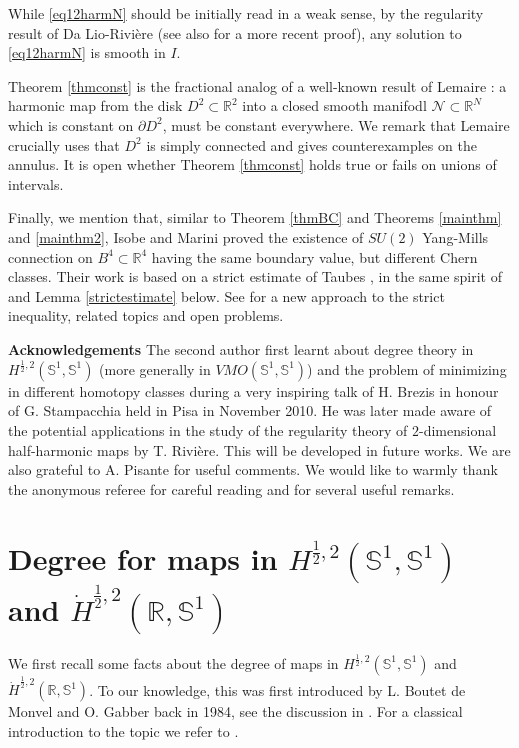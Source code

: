 \documentclass[12pt, a4paper]{article}
\newcommand{\sph}{\mathbb{S}}
\newcommand{\R}{\mathbb{R}}
\renewcommand{\(}{\left(}
\renewcommand{\)}{\right)}
\begin{document}
While \eqref{eq12harmN} should be initially read in a weak sense, by the regularity result of Da Lio-Rivi\`ere \cite{DLR2} (see also \cite{MazSch0} for a more recent proof), any solution to \eqref{eq12harmN} is smooth in $I$.

Theorem \ref{thmconst} is the fractional analog of a well-known result of Lemaire \cite{Lem}: a harmonic map from the disk $D^2\subset\R^2$ into a closed smooth manifodl $\mathcal{N}\subset\R^N$ which is constant on $\partial D^2$, must be constant everywhere. We remark that Lemaire crucially uses that $D^2$ is simply connected and gives counterexamples on the annulus. It is open whether Theorem \ref{thmconst} holds true or fails on unions of intervals.

\medskip

Finally, we mention that, similar to Theorem \ref{thmBC} and Theorems \ref{mainthm} and \ref{mainthm2}, Isobe and Marini \cite{IsoMar} proved the existence of $SU(2)$ Yang-Mills connection on $B^4\subset\R^4$ having the same boundary value, but different Chern classes. Their work is based on a strict estimate of Taubes \cite{Tau}, in the same spirit of \cite[Lemma 2]{bc} and Lemma \ref{strictestimate} below. See \cite{MarRiv} for a new approach to the strict inequality, related topics and open problems.

\medskip


\noindent\textbf{Acknowledgements} The second author first learnt about degree theory in $H^{\frac12,2}(\sph^1,\sph^1)$ (more generally in $VMO(\sph^1,\sph^1)$) and the problem of minimizing in different homotopy classes during a very inspiring talk of H. Brezis in honour of G. Stampacchia held in Pisa in November 2010. He was later made aware of the potential applications in the study of the regularity theory of $2$-dimensional half-harmonic maps by T. Rivi\`ere. This will be developed in future works. We are also grateful to A. Pisante for useful comments. We would like to warmly thank the anonymous referee for careful reading and for several useful remarks.



\section{Degree for maps in $H^{\frac{1}{2},2}(\sph^1,\sph^1)$ and $\dot H^{\frac{1}{2},2}(\R,\sph^1)$}\label{a:deg}

We first recall some facts about the degree of maps in $H^{\frac{1}{2},2}(\sph^1,\sph^1)$ and $\dot H^{\frac{1}{2},2}(\R,\sph^1)$. To our knowledge, this was first introduced by L. Boutet de Monvel and O. Gabber back in 1984, see the discussion in \cite{BGP}. For a classical introduction to the topic we refer to \cite{BN}.
\end{document}
